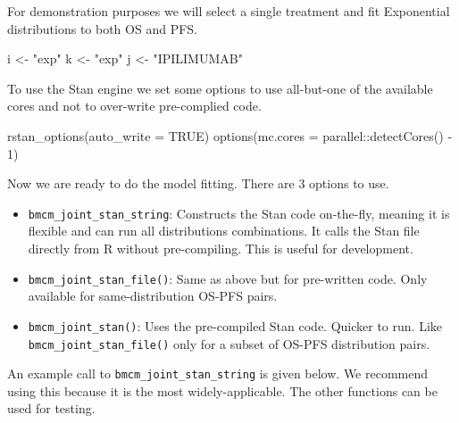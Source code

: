 \documentclass[
]{article}
\newenvironment{Shaded}{\begin{snugshade}}{\end{snugshade}}
\newcommand{\AttributeTok}[1]{\textcolor[rgb]{0.77,0.63,0.00}{#1}}
\newcommand{\ConstantTok}[1]{\textcolor[rgb]{0.00,0.00,0.00}{#1}}
\newcommand{\DecValTok}[1]{\textcolor[rgb]{0.00,0.00,0.81}{#1}}
\newcommand{\FunctionTok}[1]{\textcolor[rgb]{0.00,0.00,0.00}{#1}}
\newcommand{\NormalTok}[1]{#1}
\newcommand{\OtherTok}[1]{\textcolor[rgb]{0.56,0.35,0.01}{#1}}
\newcommand{\SpecialCharTok}[1]{\textcolor[rgb]{0.00,0.00,0.00}{#1}}
\newcommand{\StringTok}[1]{\textcolor[rgb]{0.31,0.60,0.02}{#1}}
\providecommand{\tightlist}{%
  \setlength{\itemsep}{0pt}\setlength{\parskip}{0pt}}
\begin{document}
For demonstration purposes we will select a single treatment and fit
Exponential distributions to both OS and PFS.

\begin{Shaded}
\begin{Highlighting}[]
\NormalTok{i }\OtherTok{\textless{}{-}}  \StringTok{"exp"}
\NormalTok{k }\OtherTok{\textless{}{-}} \StringTok{"exp"}
\NormalTok{j }\OtherTok{\textless{}{-}} \StringTok{"IPILIMUMAB"}
\end{Highlighting}
\end{Shaded}

To use the Stan engine we set some options to use all-but-one of the
available cores and not to over-write pre-complied code.

\begin{Shaded}
\begin{Highlighting}[]
\FunctionTok{rstan\_options}\NormalTok{(}\AttributeTok{auto\_write =} \ConstantTok{TRUE}\NormalTok{)}
\FunctionTok{options}\NormalTok{(}\AttributeTok{mc.cores =}\NormalTok{ parallel}\SpecialCharTok{::}\FunctionTok{detectCores}\NormalTok{() }\SpecialCharTok{{-}} \DecValTok{1}\NormalTok{)}
\end{Highlighting}
\end{Shaded}

Now we are ready to do the model fitting. There are 3 options to use.

\begin{itemize}
\tightlist
\item
  \texttt{bmcm\_joint\_stan\_string}: Constructs the Stan code
  on-the-fly, meaning it is flexible and can run all distributions
  combinations. It calls the Stan file directly from R without
  pre-compiling. This is useful for development.
\item
  \texttt{bmcm\_joint\_stan\_file()}: Same as above but for pre-written
  code. Only available for same-distribution OS-PFS pairs.
\item
  \texttt{bmcm\_joint\_stan()}: Uses the pre-compiled Stan code. Quicker
  to run. Like \texttt{bmcm\_joint\_stan\_file()} only for a subset of
  OS-PFS distribution pairs.
\end{itemize}

An example call to \texttt{bmcm\_joint\_stan\_string} is given below. We
recommend using this because it is the most widely-applicable. The other
functions can be used for testing.
\end{document}
